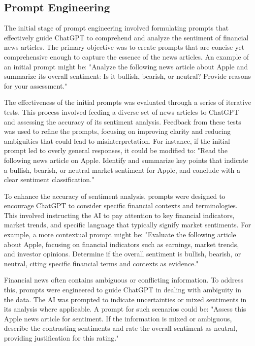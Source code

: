 \subsection{Prompt Engineering}

The initial stage of prompt engineering involved formulating prompts that effectively guide ChatGPT to comprehend and analyze the sentiment of financial news articles. The primary objective was to create prompts that are concise yet comprehensive enough to capture the essence of the news articles. An example of an initial prompt might be: "Analyze the following news article about Apple and summarize its overall sentiment: Is it bullish, bearish, or neutral? Provide reasons for your assessment."

The effectiveness of the initial prompts was evaluated through a series of iterative tests. This process involved feeding a diverse set of news articles to ChatGPT and assessing the accuracy of its sentiment analysis. Feedback from these tests was used to refine the prompts, focusing on improving clarity and reducing ambiguities that could lead to misinterpretation. For instance, if the initial prompt led to overly general responses, it could be modified to: "Read the following news article on Apple. Identify and summarize key points that indicate a bullish, bearish, or neutral market sentiment for Apple, and conclude with a clear sentiment classification."

To enhance the accuracy of sentiment analysis, prompts were designed to encourage ChatGPT to consider specific financial contexts and terminologies. This involved instructing the AI to pay attention to key financial indicators, market trends, and specific language that typically signify market sentiments. For example, a more contextual prompt might be: "Evaluate the following article about Apple, focusing on financial indicators such as earnings, market trends, and investor opinions. Determine if the overall sentiment is bullish, bearish, or neutral, citing specific financial terms and contexts as evidence."

Financial news often contains ambiguous or conflicting information. To address this, prompts were engineered to guide ChatGPT in dealing with ambiguity in the data. The AI was prompted to indicate uncertainties or mixed sentiments in its analysis where applicable. A prompt for such scenarios could be: "Assess this Apple news article for sentiment. If the information is mixed or ambiguous, describe the contrasting sentiments and rate the overall sentiment as neutral, providing justification for this rating."

